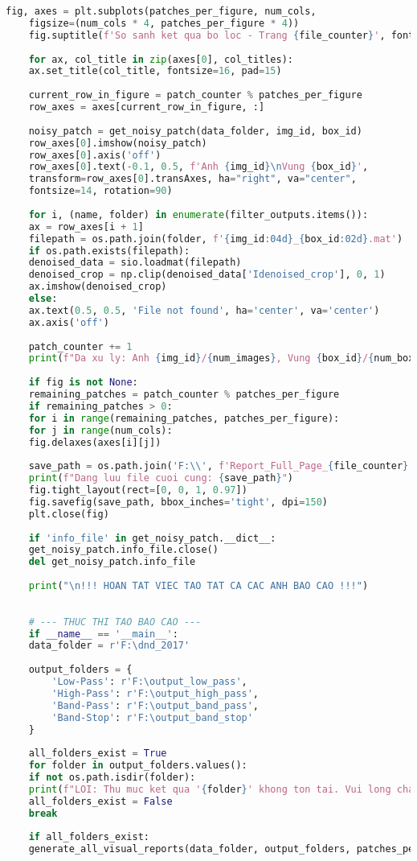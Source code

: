 \documentclass[12pt, a4paper]{article}
\begin{document}
\begin{lstlisting}[language=Python, caption={Mã nguồn tạo chuỗi ảnh báo cáo tổng hợp.}, label={lst:generate_full_report}]
	fig, axes = plt.subplots(patches_per_figure, num_cols, 
	figsize=(num_cols * 4, patches_per_figure * 4))
	fig.suptitle(f'So sanh ket qua bo loc - Trang {file_counter}', fontsize=24)
	
	for ax, col_title in zip(axes[0], col_titles):
	ax.set_title(col_title, fontsize=16, pad=15)
	
	current_row_in_figure = patch_counter % patches_per_figure
	row_axes = axes[current_row_in_figure, :]
	
	noisy_patch = get_noisy_patch(data_folder, img_id, box_id)
	row_axes[0].imshow(noisy_patch)
	row_axes[0].axis('off')
	row_axes[0].text(-0.1, 0.5, f'Anh {img_id}\nVung {box_id}', 
	transform=row_axes[0].transAxes, ha="right", va="center", 
	fontsize=14, rotation=90)
	
	for i, (name, folder) in enumerate(filter_outputs.items()):
	ax = row_axes[i + 1]
	filepath = os.path.join(folder, f'{img_id:04d}_{box_id:02d}.mat')
	if os.path.exists(filepath):
	denoised_data = sio.loadmat(filepath)
	denoised_crop = np.clip(denoised_data['Idenoised_crop'], 0, 1)
	ax.imshow(denoised_crop)
	else:
	ax.text(0.5, 0.5, 'File not found', ha='center', va='center')
	ax.axis('off')
	
	patch_counter += 1
	print(f"Da xu ly: Anh {img_id}/{num_images}, Vung {box_id}/{num_boxes_per_image}")
	
	if fig is not None:
	remaining_patches = patch_counter % patches_per_figure
	if remaining_patches > 0:
	for i in range(remaining_patches, patches_per_figure):
	for j in range(num_cols):
	fig.delaxes(axes[i][j])
	
	save_path = os.path.join('F:\\', f'Report_Full_Page_{file_counter}.png')
	print(f"Dang luu file cuoi cung: {save_path}")
	fig.tight_layout(rect=[0, 0, 1, 0.97])
	fig.savefig(save_path, bbox_inches='tight', dpi=150)
	plt.close(fig)
	
	if 'info_file' in get_noisy_patch.__dict__:
	get_noisy_patch.info_file.close()
	del get_noisy_patch.info_file
	
	print("\n!!! HOAN TAT VIEC TAO TAT CA CAC ANH BAO CAO !!!")
	
	
	# --- THUC THI TAO BAO CAO ---
	if __name__ == '__main__':
	data_folder = r'F:\dnd_2017'
	
	output_folders = {
		'Low-Pass': r'F:\output_low_pass',
		'High-Pass': r'F:\output_high_pass',
		'Band-Pass': r'F:\output_band_pass',
		'Band-Stop': r'F:\output_band_stop'
	}
	
	all_folders_exist = True
	for folder in output_folders.values():
	if not os.path.isdir(folder):
	print(f"LOI: Thu muc ket qua '{folder}' khong ton tai. Vui long chay file 'run_denoising.py' truoc.")
	all_folders_exist = False
	break
	
	if all_folders_exist:
	generate_all_visual_reports(data_folder, output_folders, patches_per_figure=5)
\end{lstlisting}
\end{document}

